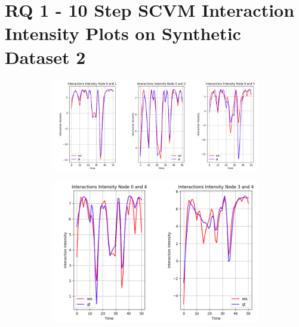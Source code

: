 \section{RQ 1 - 10 Step SCVM Interaction Intensity Plots on Synthetic Dataset 2}
\label{appendix:rq1:part2:10step_intensity}
\begin{figure}[H]
    \centering
    \begin{subfigure}[b]{\textwidth}
        \centering
        \includegraphics[width=\textwidth]{0_images/appendix_rq1_10step_SCVM_intensity1.png}
    \end{subfigure}
    \vfill
    \begin{subfigure}[b]{\textwidth}
        \centering
        \includegraphics[width=\textwidth]{0_images/appendix_rq1_10step_SCVM_intensity2.png}
    \end{subfigure}
\end{figure}
